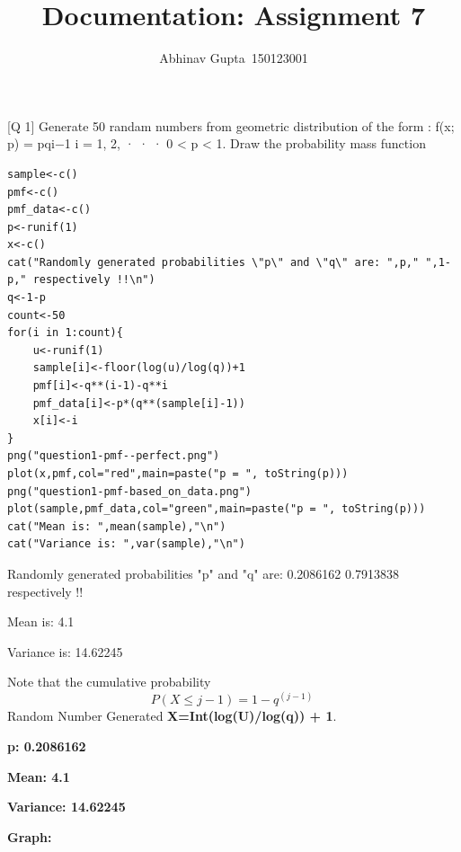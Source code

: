 \documentclass[11pt]{article}
\title{Documentation: Assignment 7}
\author{Abhinav Gupta\
 150123001}
\begin{document}
\titlepage
\newpage

[Q 1] Generate 50 randam numbers from geometric distribution of the form :
f(x; p) = pqi−1
i = 1, 2, · · · 0 < p < 1.
Draw the probability mass function


\begin{lstlisting}
sample<-c()
pmf<-c()
pmf_data<-c()
p<-runif(1)
x<-c()
cat("Randomly generated probabilities \"p\" and \"q\" are: ",p," ",1-p," respectively !!\n")
q<-1-p
count<-50
for(i in 1:count){
	u<-runif(1)
	sample[i]<-floor(log(u)/log(q))+1
	pmf[i]<-q**(i-1)-q**i
	pmf_data[i]<-p*(q**(sample[i]-1))
	x[i]<-i
}
png("question1-pmf--perfect.png")
plot(x,pmf,col="red",main=paste("p = ", toString(p)))
png("question1-pmf-based_on_data.png")
plot(sample,pmf_data,col="green",main=paste("p = ", toString(p)))
cat("Mean is: ",mean(sample),"\n")
cat("Variance is: ",var(sample),"\n")

\end{lstlisting}

Randomly generated probabilities "p" and "q" are:  0.2086162   0.7913838  respectively !!\

Mean is:  4.1\

Variance is:  14.62245\


	Note that the cumulative probability\
	\begin{equation}
	P(X ≤ j−1) = 1−q^{(j−1)}\
	\end{equation}
	Random Number Generated \textbf{X=Int(log(U)/log(q)) + 1}.\

	\textbf{p: 0.2086162}\

	\textbf{Mean: 4.1}\

	\textbf{Variance: 14.62245}\

	\textbf{Graph: }\
\end{document}
